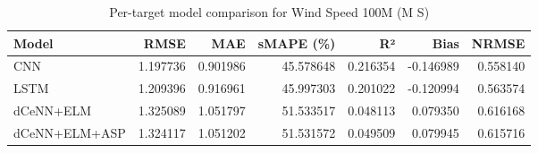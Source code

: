 \begin{table}
\caption{Per-target model comparison for Wind Speed 100M (M S)}
\begin{tabular}{lrrrrrr}
\toprule
Model & RMSE & MAE & sMAPE (\%) & R² & Bias & NRMSE \\
\midrule
CNN & 1.197736 & 0.901986 & 45.578648 & 0.216354 & -0.146989 & 0.558140 \\
LSTM & 1.209396 & 0.916961 & 45.997303 & 0.201022 & -0.120994 & 0.563574 \\
dCeNN+ELM & 1.325089 & 1.051797 & 51.533517 & 0.048113 & 0.079350 & 0.616168 \\
dCeNN+ELM+ASP & 1.324117 & 1.051202 & 51.531572 & 0.049509 & 0.079945 & 0.615716 \\
\bottomrule
\end{tabular}
\end{table}

